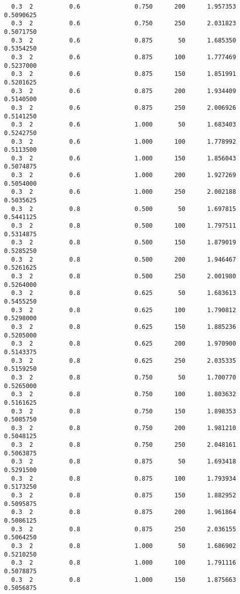 \documentclass[
  letterpaper,
  DIV=11,
  numbers=noendperiod]{scrartcl}
\begin{document}
\begin{verbatim}
  0.3  2          0.6               0.750      200      1.957353  0.5090625
  0.3  2          0.6               0.750      250      2.031823  0.5071750
  0.3  2          0.6               0.875       50      1.685350  0.5354250
  0.3  2          0.6               0.875      100      1.777469  0.5237000
  0.3  2          0.6               0.875      150      1.851991  0.5201625
  0.3  2          0.6               0.875      200      1.934409  0.5140500
  0.3  2          0.6               0.875      250      2.006926  0.5141250
  0.3  2          0.6               1.000       50      1.683403  0.5242750
  0.3  2          0.6               1.000      100      1.778992  0.5113500
  0.3  2          0.6               1.000      150      1.856043  0.5074875
  0.3  2          0.6               1.000      200      1.927269  0.5054000
  0.3  2          0.6               1.000      250      2.002188  0.5035625
  0.3  2          0.8               0.500       50      1.697815  0.5441125
  0.3  2          0.8               0.500      100      1.797511  0.5314875
  0.3  2          0.8               0.500      150      1.879019  0.5285250
  0.3  2          0.8               0.500      200      1.946467  0.5261625
  0.3  2          0.8               0.500      250      2.001980  0.5264000
  0.3  2          0.8               0.625       50      1.683613  0.5455250
  0.3  2          0.8               0.625      100      1.790812  0.5298000
  0.3  2          0.8               0.625      150      1.885236  0.5205000
  0.3  2          0.8               0.625      200      1.970900  0.5143375
  0.3  2          0.8               0.625      250      2.035335  0.5159250
  0.3  2          0.8               0.750       50      1.700770  0.5265000
  0.3  2          0.8               0.750      100      1.803632  0.5161625
  0.3  2          0.8               0.750      150      1.898353  0.5085750
  0.3  2          0.8               0.750      200      1.981210  0.5048125
  0.3  2          0.8               0.750      250      2.048161  0.5063875
  0.3  2          0.8               0.875       50      1.693418  0.5291500
  0.3  2          0.8               0.875      100      1.793934  0.5173250
  0.3  2          0.8               0.875      150      1.882952  0.5095875
  0.3  2          0.8               0.875      200      1.961864  0.5086125
  0.3  2          0.8               0.875      250      2.036155  0.5064250
  0.3  2          0.8               1.000       50      1.686902  0.5210250
  0.3  2          0.8               1.000      100      1.791116  0.5078875
  0.3  2          0.8               1.000      150      1.875663  0.5056875

\end{verbatim}
\end{document}
